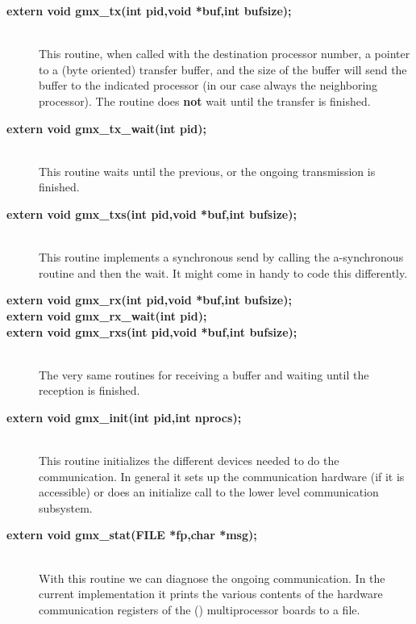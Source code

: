 \begin{description}
\item[{\bf extern void gmx_tx(int pid,void *buf,int bufsize);}]\mbox{}\\ 
This routine, when called with the destination processor number, a
pointer to a (byte oriented) transfer buffer, and the size of the
buffer will send the buffer to the indicated processor (in our case
always the neighboring processor). The routine does {\bf not} wait
until the transfer is finished.

\item[{\bf extern void gmx_tx_wait(int pid);}]\mbox{}\\
This routine waits until the previous, or the ongoing transmission is
finished.

\item[{\bf extern void gmx_txs(int pid,void *buf,int bufsize);}]\mbox{}\\
This routine implements a synchronous send by calling the
a-synchronous routine and then the wait. It might come in handy to
code this differently.

\item[{\bf extern void gmx_rx(int pid,void *buf,int bufsize);}]
\item[{\bf extern void gmx_rx_wait(int pid);}]\vspace{-\itemsep}
\item[{\bf extern void gmx_rxs(int pid,void *buf,int bufsize);}]\vspace{-\itemsep}\mbox{}\\
The very same routines for receiving a buffer and waiting until the
reception is finished.

\item[{\bf extern void gmx_init(int pid,int nprocs);}]\mbox{}\\
This routine initializes the different devices needed to do the
communication. In general it sets up the communication hardware (if it
is accessible) or does an initialize call to the lower level
communication subsystem.

\item[{\bf extern void gmx_stat(FILE *fp,char *msg);}]\mbox{}\\
With this routine we can diagnose the ongoing communication. In the
current implementation it prints the various contents of the hardware
communication registers of the (\intel) multiprocessor boards to a
file.
\end{description}

